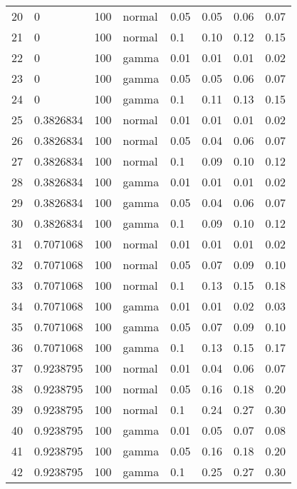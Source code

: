 \begin{table}[ht]
\begin{tabular}{rllllrrr}
  20 & 0 & 100 & normal & 0.05 & 0.05 & 0.06 & 0.07 \\ 
  21 & 0 & 100 & normal & 0.1 & 0.10 & 0.12 & 0.15 \\ 
  22 & 0 & 100 & gamma & 0.01 & 0.01 & 0.01 & 0.02 \\ 
  23 & 0 & 100 & gamma & 0.05 & 0.05 & 0.06 & 0.07 \\ 
  24 & 0 & 100 & gamma & 0.1 & 0.11 & 0.13 & 0.15 \\ 
  25 & 0.3826834 & 100 & normal & 0.01 & 0.01 & 0.01 & 0.02 \\ 
  26 & 0.3826834 & 100 & normal & 0.05 & 0.04 & 0.06 & 0.07 \\ 
  27 & 0.3826834 & 100 & normal & 0.1 & 0.09 & 0.10 & 0.12 \\ 
  28 & 0.3826834 & 100 & gamma & 0.01 & 0.01 & 0.01 & 0.02 \\ 
  29 & 0.3826834 & 100 & gamma & 0.05 & 0.04 & 0.06 & 0.07 \\ 
  30 & 0.3826834 & 100 & gamma & 0.1 & 0.09 & 0.10 & 0.12 \\ 
  31 & 0.7071068 & 100 & normal & 0.01 & 0.01 & 0.01 & 0.02 \\ 
  32 & 0.7071068 & 100 & normal & 0.05 & 0.07 & 0.09 & 0.10 \\ 
  33 & 0.7071068 & 100 & normal & 0.1 & 0.13 & 0.15 & 0.18 \\ 
  34 & 0.7071068 & 100 & gamma & 0.01 & 0.01 & 0.02 & 0.03 \\ 
  35 & 0.7071068 & 100 & gamma & 0.05 & 0.07 & 0.09 & 0.10 \\ 
  36 & 0.7071068 & 100 & gamma & 0.1 & 0.13 & 0.15 & 0.17 \\ 
  37 & 0.9238795 & 100 & normal & 0.01 & 0.04 & 0.06 & 0.07 \\ 
  38 & 0.9238795 & 100 & normal & 0.05 & 0.16 & 0.18 & 0.20 \\ 
  39 & 0.9238795 & 100 & normal & 0.1 & 0.24 & 0.27 & 0.30 \\ 
  40 & 0.9238795 & 100 & gamma & 0.01 & 0.05 & 0.07 & 0.08 \\ 
  41 & 0.9238795 & 100 & gamma & 0.05 & 0.16 & 0.18 & 0.20 \\ 
  42 & 0.9238795 & 100 & gamma & 0.1 & 0.25 & 0.27 & 0.30 \\ 
   \hline
\end{tabular}
\end{table}

